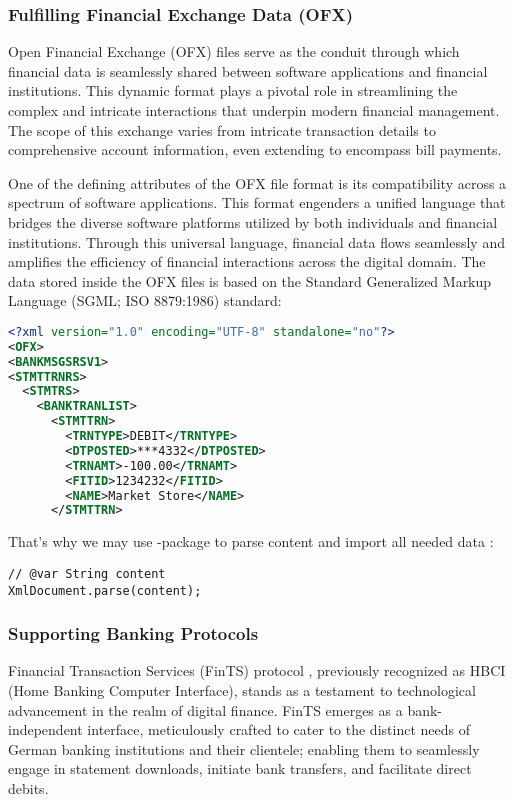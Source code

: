 \subsubsection{Fulfilling Financial Exchange Data (OFX)}

Open Financial Exchange (OFX) files serve as the conduit through which financial data is seamlessly shared between 
software applications and financial institutions. This dynamic format plays a pivotal role in streamlining the complex 
and intricate interactions that underpin modern financial management. The scope of this exchange varies from intricate 
transaction details to comprehensive account information, even extending to encompass bill payments.

One of the defining attributes of the OFX file format is its compatibility across a spectrum of software applications. 
This format engenders a unified language that bridges the diverse software platforms utilized by both individuals and 
financial institutions. Through this universal language, financial data flows seamlessly and amplifies the efficiency 
of financial interactions across the digital domain. The data stored inside the OFX files is based on the Standard 
Generalized Markup Language (SGML; ISO 8879:1986) standard:

\begin{lstlisting}[language=xml]
<?xml version="1.0" encoding="UTF-8" standalone="no"?>
<OFX>
<BANKMSGSRSV1>
<STMTTRNRS>
  <STMTRS>
    <BANKTRANLIST>
      <STMTTRN>
        <TRNTYPE>DEBIT</TRNTYPE>
        <DTPOSTED>***4332</DTPOSTED>
        <TRNAMT>-100.00</TRNAMT>
        <FITID>1234232</FITID>
        <NAME>Market Store</NAME>
      </STMTTRN>
\end{lstlisting}

\noindent That's why we may use -package to parse content and import all needed data :

\begin{lstlisting}
// @var String content
XmlDocument.parse(content);
\end{lstlisting}


\subsubsection{Supporting Banking Protocols}

Financial Transaction Services (FinTS) protocol , previously recognized as HBCI (Home Banking Computer 
Interface), stands as a testament to technological advancement in the realm of digital finance. FinTS emerges as a 
bank-independent interface, meticulously crafted to cater to the distinct needs of German banking institutions and 
their clientele; enabling them to seamlessly engage in statement downloads, initiate bank transfers, and facilitate 
direct debits. 

